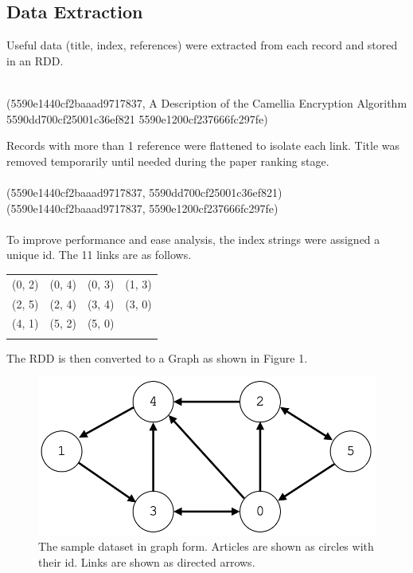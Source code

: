 \documentclass[journal]{IEEEtran}
\begin{document}
\subsection{Data Extraction}
Useful data (title, index, references) were extracted from each record and stored in an RDD.\\\\
\begin{center}
\small 
(5590e1440cf2baaad9717837, A Description of the Camellia Encryption Algorithm 5590dd700cf25001c36ef821   5590e1200cf237666fc297fe)
\normalsize
\end{center}
Records with more than 1 reference were flattened to isolate each link. Title was removed temporarily until needed during the paper ranking stage.\\\\
(5590e1440cf2baaad9717837, 5590dd700cf25001c36ef821)\\
(5590e1440cf2baaad9717837, 5590e1200cf237666fc297fe)\\\\
To improve performance and ease analysis, the index strings were assigned a unique id. The 11 links are as follows.\\
\begin{center}
\begin{tabular}{ c c c c }
(0, 2)   & (0, 4)   & (0, 3)  & (1, 3)\\
(2, 5)   & (2, 4)  & (3, 4)   & (3, 0)\\
(4, 1)  & (5, 2)   &  (5, 0)\\\\
\end{tabular}
\end{center}
The RDD is then converted to a Graph as shown in Figure 1.
\begin{figure}[h!]
\begin{center}\includegraphics[scale=0.2]{1.png}\end{center}
\caption{The sample dataset in graph form. Articles are shown as circles with their id. Links are shown as directed arrows.}
\end{figure}
\end{document}

